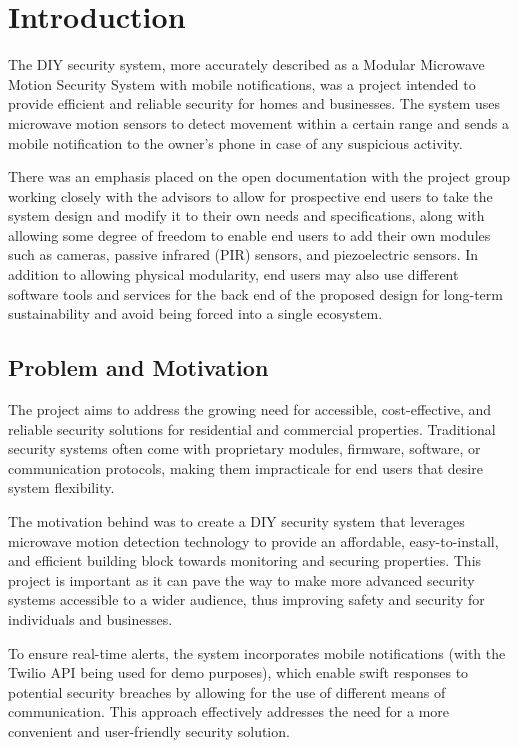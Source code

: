 \section{Introduction}\label{sec:intro}

The \brand{} DIY security system, more accurately described as a Modular Microwave Motion
Security System with mobile notifications, was a project intended to provide efficient
and reliable security for homes and businesses. The system uses microwave motion
sensors to detect movement within a certain range and sends a mobile notification to
the owner's phone in case of any suspicious activity.

There was an emphasis placed on the open documentation with the project group working
closely with the advisors to allow for prospective end users to take the system design
and modify it to their own needs and specifications, along with allowing some degree of
freedom to enable end users to add their own modules such as cameras, passive infrared
(PIR) sensors, and piezoelectric sensors. In addition to allowing physical modularity, end users
may also use different software tools and services for the back end of the proposed design for
long-term sustainability and avoid being forced into a single ecosystem.

\subsection{Problem and Motivation}\label{subsec:problem-and-motivation}

The \brand{} project aims to address the growing need for accessible, cost-effective,
and reliable security solutions for residential and commercial properties.
Traditional security systems often come with proprietary modules, firmware, software,
or communication protocols, making them impracticale for end users that desire system flexibility.

The motivation behind \brand{} was to create a DIY security system that leverages
microwave motion detection technology to provide an affordable, easy-to-install, and
efficient building block towards monitoring and securing properties. This project is important as
it can pave the way to make more advanced security systems accessible to a wider
audience, thus improving safety and security for individuals and businesses.

To ensure real-time alerts, the system incorporates mobile notifications (with the Twilio API
being used for demo purposes), which enable swift responses to potential security breaches by
allowing for the use of different means of communication. This approach effectively addresses
the need for a more convenient and user-friendly security solution.

